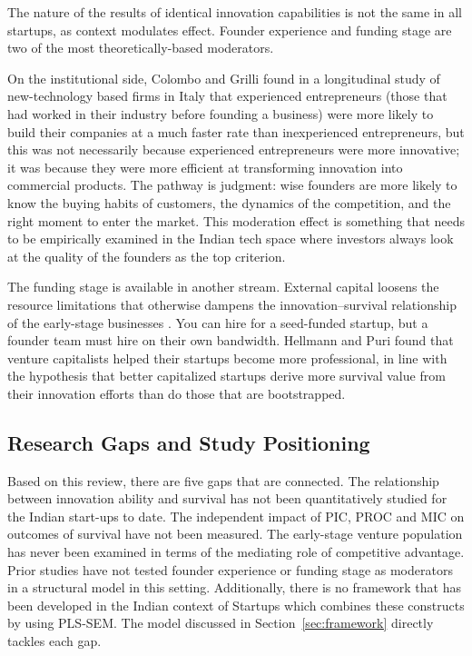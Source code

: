 \documentclass{ieeeaccess}
\begin{document}
The nature of the results of identical innovation capabilities is not the same in all startups, as context modulates effect. Founder experience and funding stage are two of the most theoretically-based moderators.

On the institutional side, Colombo and Grilli \cite{b19} found in a longitudinal study of new-technology based firms in Italy that experienced entrepreneurs (those that had worked in their industry before founding a business) were more likely to build their companies at a much faster rate than inexperienced entrepreneurs, but this was not necessarily because experienced entrepreneurs were more innovative; it was because they were more efficient at transforming innovation into commercial products. The pathway is judgment: wise founders are more likely to know the buying habits of customers, the dynamics of the competition, and the right moment to enter the market. This moderation effect is something that needs to be empirically examined in the Indian tech space where investors always look at the quality of the founders as the top criterion.

The funding stage is available in another stream. External capital loosens the resource limitations that otherwise dampens the innovation--survival relationship of the early-stage businesses \cite{b20}. You can hire for a seed-funded startup, but a founder team must hire on their own bandwidth. Hellmann and Puri \cite{b20} found that venture capitalists helped their startups become more professional, in line with the hypothesis that better capitalized startups derive more survival value from their innovation efforts than do those that are bootstrapped.

\subsection{Research Gaps and Study Positioning}

Based on this review, there are five gaps that are connected. The relationship between innovation ability and survival has not been quantitatively studied for the Indian start-ups to date. The independent impact of PIC, PROC and MIC on outcomes of survival have not been measured. The early-stage venture population has never been examined in terms of the mediating role of competitive advantage. Prior studies have not tested founder experience or funding stage as moderators in a structural model in this setting. Additionally, there is no framework that has been developed in the Indian context of Startups which combines these constructs by using PLS-SEM. The model discussed in Section~\ref{sec:framework} directly tackles each gap.
\end{document}
